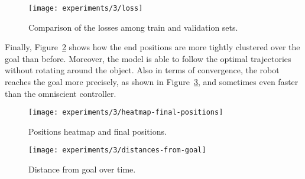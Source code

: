 \begin{figure}[htbp]
	
	\centerline{\texttt{[image: experiments/3/loss]}}
	\caption{Comparison of the losses among train and validation sets.}
	\label{fig:loss-3}
\end{figure}

Finally, Figure~\ref{fig:heatmap-final-positions} shows how the end positions 
are more tightly clustered over the goal than before. Moreover, the model is 
able to follow the optimal trajectories without rotating around the object.
Also in terms of convergence, the robot reaches the goal more precisely, as 
shown in Figure~\ref{fig:distance-from-goal-learned3}, and sometimes even 
faster than the omniscient controller.

\begin{figure}[htbp]
	\centerline{\texttt{[image: experiments/3/heatmap-final-positions]}}
	\caption{Positions heatmap and final positions.}
	\label{fig:heatmap-final-positions}
\end{figure}

\begin{figure}[htbp]
	\centerline{\texttt{[image: experiments/3/distances-from-goal]}}
	\caption{Distance from goal over time.}
	\label{fig:distance-from-goal-learned3}
\end{figure}